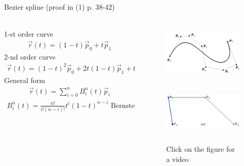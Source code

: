 \documentclass[aspectratio=169]{beamer}
\begin{document}
\begin{frame}[t]{Bezier spline (proof in (1) p. 38-42)}
\framesubtitle{}
    \begin{columns}[T,onlytextwidth]
        \begin{column}{0.59\textwidth}
            1-st order curve
            \begin{align*}
                \vec{r}(t)=(1-t)\vec{p}_{0}+t\vec{p}_{1}
            \end{align*}
            2-nd order curve
            \begin{align*}
                \vec{r}(t)=(1-t)^{2}\vec{p}_{0}+2t(1-t)\vec{p}_{1}+t^{2}\vec{p}_{2}
            \end{align*}
            General form
            \begin{align*}
                \vec{r}(t) = \sum_{i=0}^{n} B_i^n(t)\vec{p}_i
            \end{align*}
            \begin{align*}
                B_i^n(t) = \frac{n!}{i!(n-i)!}t^i(1-t)^{n-i} \text{ Bernstein polynomials}
            \end{align*}
        \end{column}
        \begin{column}{0.39\textwidth}
            \vspace{-1cm}
            \begin{figure}[H]
                \centering\includegraphics[height=2.5cm,width=1\textwidth,keepaspectratio]{bezier_spline_book.png}
                \label{fig:bezier_spline_book.png}
            \end{figure}
            \begin{figure}[H]
                \href{run:./videos/bezier_big.gif}{
                    \centering\includegraphics[height=2.5cm,width=1\textwidth,keepaspectratio]{bezier_big.png}}
                \caption*{Click on the figure for a video}
            \end{figure}
        \end{column}
    \end{columns}
\end{frame}
\end{document}

